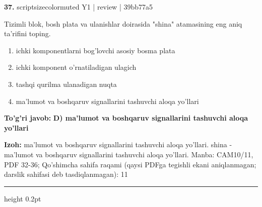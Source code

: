 \documentclass[10pt,a4paper]{article}
\begin{document}
{\bfseries\sffamily\color{ink} 37.} {scriptsizecolor{muted} Y1 | review | 39bb77a5}
\par
Tizimli blok, bosh plata va ulanishlar doirasida "shina" atamasining eng aniq ta'rifini toping.
\begin{enumerate}[label=\Alph*),leftmargin=9mm]
\item ichki komponentlarni bog'lovchi asosiy bosma plata
\item ichki komponent o'rnatiladigan ulagich
\item tashqi qurilma ulanadigan nuqta
\item ma'lumot va boshqaruv signallarini tashuvchi aloqa yo'llari
\end{enumerate}
\begin{tcolorbox}[enhanced,breakable,colback=teal!4,colframe=teal!60!black,boxrule=0.45pt,arc=1.2mm,left=2.7mm,right=2.7mm,top=1.8mm,bottom=1.8mm,before skip=2mm,after skip=2mm]
{\bfseries\sffamily\color{teal}To'g'ri javob:} \textbf{D) ma'lumot va boshqaruv signallarini tashuvchi aloqa yo'llari}
\par\smallskip
{\bfseries Izoh:} ma'lumot va boshqaruv signallarini tashuvchi aloqa yo'llari. shina - ma'lumot va boshqaruv signallarini tashuvchi aloqa yo'llari. Manba: CAM10/11, PDF 32-36; Qo'shimcha sahifa raqami (qaysi PDFga tegishli ekani aniqlanmagan; darslik sahifasi deb tasdiqlanmagan): 11
\end{tcolorbox}
\vspace{2mm}\hrule height 0.2pt\vspace{3mm}
\end{document}
